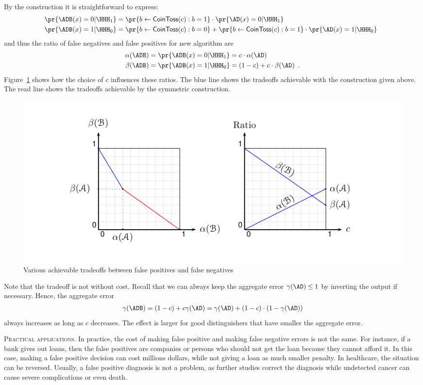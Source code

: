 \documentclass{crypto-exercise}
\newcommand{\CTOSS}{\mathsf{CoinToss}}
\begin{document}
\begin{solution}
By the construction it is straightforward to express: 
\begin{align*}
\pr{\ADB(x) = 0|\HHH_1} &= \pr{b\gets\CTOSS(c):b=1} \cdot \pr{ \AD(x) = 0 | \HHH_1} \\
\pr{\ADB(x) = 1|\HHH_0} & =\pr{b\gets\CTOSS(c):b=0 } +  \pr{b\gets\CTOSS(c):b=1} \cdot \pr{ \AD(x) = 1 | \HHH_0 }\enspace
\end{align*}
and thus the ratio of false negatives and false positives for  new algorithm are
\begin{align*}
\alpha(\ADB)&=\pr{\ADB(x) = 0|\HHH_1} = c \cdot \alpha (\AD)\\
\beta(\ADB)&=\pr{\ADB(x) = 1|\HHH_0}= (1-c) + c \cdot \beta(\AD)\enspace.
\end{align*}
Figure~\ref{fig:tradeoffs} shows how the choice of $c$ influences these ratios. The blue line shows the tradeoffs achievable with the construction given above. The read line shows the tradeoffs achievable by the symmetric construction.

\begin{figure}[H]
\begin{center}
\includegraphics{figures/0303-tradeoffs}
\end{center}
\caption{Various achievable tradeoffs between false positives and false negatives}
\label{fig:tradeoffs}
\end{figure} 

\noindent 
Note that the tradeoff is not without cost. Recall that we can always keep the aggregate error $\gamma(\AD)\leq 1$ by inverting the output if necessary. Hence, the aggregate error 
\begin{align*}
 \gamma(\ADB)=(1-c)+c\gamma(\AD)= \gamma(\AD) + (1-c)\cdot(1-\gamma(\AD))
\end{align*}
always increases as long as $c$ decreases.  The effect is larger for good distinguishers that have smaller the aggregate error. 
 
\vspace*{2ex}
\noindent
\textsc{Practical applications.} 
In practice, the cost of making false positive and making false negative errors is not the same. For instance, if a bank gives out  loans, then the false positives are companies or persons who should not get the loan because they cannot afford it. In this case, making a false positive decision can cost millions dollars, while not giving a loan as much smaller penalty. In healthcare, the situation can be reversed. Usually, a false positive diagnosis is not a problem, as further studies correct the diagnosis while undetected cancer can cause severe complications or even death.    

\end{solution}
\end{document}
